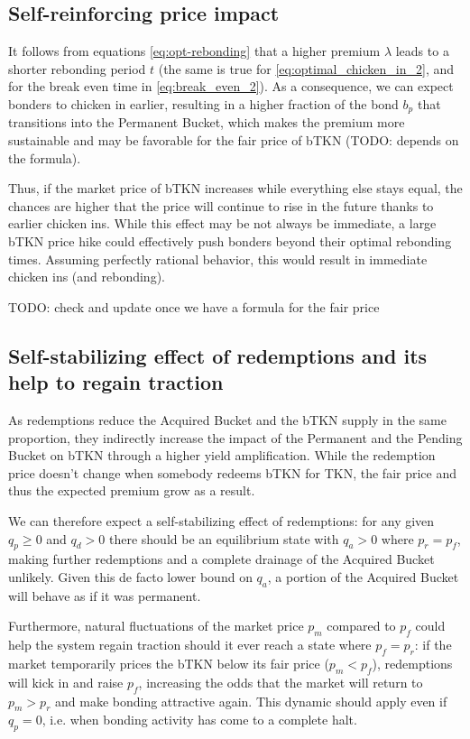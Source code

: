 \documentclass{article}
\begin{document}
\subsection{Self-reinforcing price impact}
It follows from equations \ref{eq:opt-rebonding} that a higher premium $\lambda$ leads to a shorter rebonding period $t$ (the same is true for \ref{eq:optimal_chicken_in_2}, and for the break even time in \ref{eq:break_even_2}). As a consequence, we can expect bonders to chicken in earlier, resulting in a higher fraction of the bond $b_p$ that transitions into the Permanent Bucket, which makes the premium more sustainable and may be favorable for the fair price of bTKN (TODO: depends on the formula).

Thus, if the market price of bTKN increases while everything else stays equal, the chances are higher that the price will continue to rise in the future thanks to earlier chicken ins. While this effect may be not always be immediate, a large bTKN price hike could effectively push bonders beyond their optimal rebonding times.
Assuming perfectly rational behavior, this would result in immediate chicken ins (and rebonding).

TODO: check and update once we have a formula for the fair price

\subsection{Self-stabilizing effect of redemptions and its help to regain traction}
  \label{sec:self-stabilizing}
As redemptions reduce the Acquired Bucket and the bTKN supply in the same proportion, they indirectly increase the impact of the Permanent and the Pending Bucket on bTKN through a higher yield amplification. While the redemption price doesn't change when somebody redeems bTKN for TKN, the fair price and thus the expected premium grow as a result. 

We can therefore expect a self-stabilizing effect of redemptions: for any given $q_p \geq 0$ and $q_d > 0$ there should be an equilibrium state with $q_a > 0$ where $p_r = p_f$, making further redemptions and a complete drainage of the Acquired Bucket unlikely. Given this de facto lower bound on $q_a$, a portion of the Acquired Bucket will behave as if it was permanent.

Furthermore, natural fluctuations of the market price $p_m$ compared to $p_f$ could help the system regain traction should it ever reach a state where $p_f = p_r$: if the market temporarily prices the bTKN below its fair price ($p_m < p_f$), redemptions will kick in and raise $p_f$, increasing the odds that the market will return to $p_m > p_r$ and make bonding attractive again. This dynamic should apply even if $q_p = 0$, i.e. when bonding activity has come to a complete halt.
\end{document}

